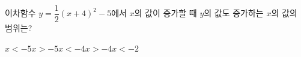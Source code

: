 이차함수 $y=\dfrac{1}{2}(x+4)^2-5$에서 $x$의 값이 증가할 때 $y$의 값도 증가하는 $x$의 값의 범위는?
\begin{choices32}{$x<-5$}{$x>-5$}{$x<-4$}{$x>-4$}{$x<-2$}\end{choices32}
